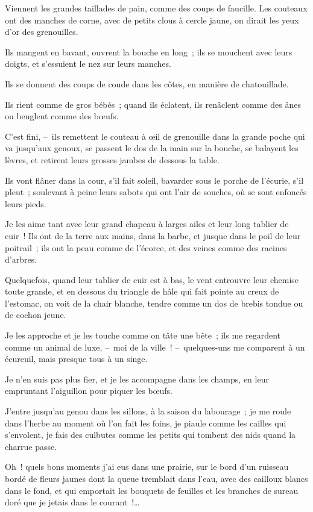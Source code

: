\documentclass[french,twoside]{book} %
\begin{document}
Viennent les grandes taillades de pain, comme des coups de faucille. Les couteaux ont des manches de corne, avec de petits clous à cercle jaune, on dirait les yeux d’or des grenouilles.\par
Ils mangent en bavant, ouvrent la bouche en long ; ils se mouchent avec leurs doigts, et s’essuient le nez sur leurs manches.\par
Ils se donnent des coups de coude dans les côtes, en manière de chatouillade.\par
Ils rient comme de gros bébés ; quand ils éclatent, ils renâclent comme des ânes ou beuglent comme des bœufs.\par
\bigbreak
\noindent C’est fini, – ils remettent le couteau à œil de grenouille dans la grande poche qui va jusqu’aux genoux, se passent le dos de la main sur la bouche, se balayent les lèvres, et retirent leurs grosses jambes de dessous la table.\par
Ils vont flâner dans la cour, s’il fait soleil, bavarder sous le porche de l’écurie, s’il pleut ; soulevant à peine leurs sabots qui ont l’air de souches, où se sont enfoncés leurs pieds.\par
Je les aime tant avec leur grand chapeau à larges ailes et leur long tablier de cuir ! Ils ont de la terre aux mains, dans la barbe, et jusque dans le poil de leur poitrail ; ils ont la peau comme de l’écorce, et des veines comme des racines d’arbres.\par
Quelquefois, quand leur tablier de cuir est à bas, le vent entrouvre leur chemise toute grande, et en dessous du triangle de hâle qui fait pointe au creux de l’estomac, on voit de la chair blanche, tendre comme un dos de brebis tondue ou de cochon jeune.\par
Je les approche et je les touche comme on tâte une bête ; ils me regardent comme un animal de luxe, – moi de la ville ! – quelques-uns me comparent à un écureuil, mais presque tous à un singe.\par
Je n’en suis pas plus fier, et je les accompagne dans les champs, en leur empruntant l’aiguillon pour piquer les bœufs.\par
J’entre jusqu’au genou dans les sillons, à la saison du labourage ; je me roule dans l’herbe au moment où l’on fait les foins, je piaule comme les cailles qui s’envolent, je fais des culbutes comme les petits qui tombent des nids quand la charrue passe.\par
Oh ! quels bons moments j’ai eus dans une prairie, sur le bord d’un ruisseau bordé de fleurs jaunes dont la queue tremblait dans l’eau, avec des cailloux blancs dans le fond, et qui emportait les bouquets de feuilles et les branches de sureau doré que je jetais dans le courant !…\par
\end{document}
